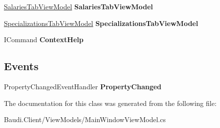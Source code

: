 \begin{DoxyCompactItemize}
\item 
\hypertarget{class_baudi_1_1_client_1_1_view_models_1_1_main_window_view_model_a162d06d90118b68d0f6bf2fe7af16487}{}\hyperlink{class_baudi_1_1_client_1_1_view_models_1_1_tabs_view_models_1_1_salaries_tab_view_model}{Salaries\+Tab\+View\+Model} {\bfseries Salaries\+Tab\+View\+Model}\label{class_baudi_1_1_client_1_1_view_models_1_1_main_window_view_model_a162d06d90118b68d0f6bf2fe7af16487}

\item 
\hypertarget{class_baudi_1_1_client_1_1_view_models_1_1_main_window_view_model_ae103b0d6c35be1510fbd5fb4593f649b}{}\hyperlink{class_baudi_1_1_client_1_1_view_models_1_1_tabs_view_models_1_1_specializations_tab_view_model}{Specializations\+Tab\+View\+Model} {\bfseries Specializations\+Tab\+View\+Model}\label{class_baudi_1_1_client_1_1_view_models_1_1_main_window_view_model_ae103b0d6c35be1510fbd5fb4593f649b}

\item 
\hypertarget{class_baudi_1_1_client_1_1_view_models_1_1_main_window_view_model_ade7ed0a1fc51271d3f170c3147475ebd}{}I\+Command {\bfseries Context\+Help}\label{class_baudi_1_1_client_1_1_view_models_1_1_main_window_view_model_ade7ed0a1fc51271d3f170c3147475ebd}

\end{DoxyCompactItemize}
\subsection*{Events}
\begin{DoxyCompactItemize}
\item 
\hypertarget{class_baudi_1_1_client_1_1_view_models_1_1_main_window_view_model_ae14f7cf5f50cc34d1f3807b67930c9c2}{}Property\+Changed\+Event\+Handler {\bfseries Property\+Changed}\label{class_baudi_1_1_client_1_1_view_models_1_1_main_window_view_model_ae14f7cf5f50cc34d1f3807b67930c9c2}

\end{DoxyCompactItemize}


The documentation for this class was generated from the following file\+:\begin{DoxyCompactItemize}
\item 
Baudi.\+Client/\+View\+Models/Main\+Window\+View\+Model.\+cs\end{DoxyCompactItemize}

